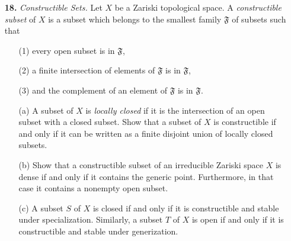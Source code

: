 \documentclass{article}
\begin{document}
\begin{enumerate} [label=\textbf{\arabic*.}, leftmargin=0em]
\item[\textbf{18.}] \textit{Constructible Sets.} Let $X$ be a Zariski topological space. A \textit{constructible subset} of $X$ is a subset which belongs to the smallest family $\mathfrak{F}$ of subsets such that
\begin{itemize}
    \item[(1)] every open subset is in $\mathfrak{F}$,
    \item[(2)] a finite intersection of elements of $\mathfrak{F}$ is in $\mathfrak{F}$,
    \item[(3)] and the complement of an element of $\mathfrak{F}$ is in $\mathfrak{F}$.
\end{itemize}
\begin{itemize} [leftmargin=0cm]
    \item[(a)] A subset of $X$ is \textit{locally closed} if it is the intersection of an open subset with a closed subset. Show that a subset of $X$ is constructible if and only if it can be written as a finite disjoint union of locally closed subsets.
    \item[(b)] Show that a constructible subset of an irreducible Zariski space $X$ is dense if and only if it contains the generic point. Furthermore, in that case it contains a nonempty open subset.
    \item[(c)] A subset $S$ of $X$ is closed if and only if it is constructible and stable under specialization. Similarly, a subset $T$ of $X$ is open if and only if it is constructible and stable under generization.
\end{itemize}


\end{enumerate}
\end{document}
